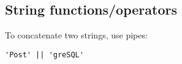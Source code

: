 \color{red}
\subsection{String functions/operators}
To concatenate two strings, use pipes:
\begin{verbatim}
'Post' || 'greSQL'
\end{verbatim}
%